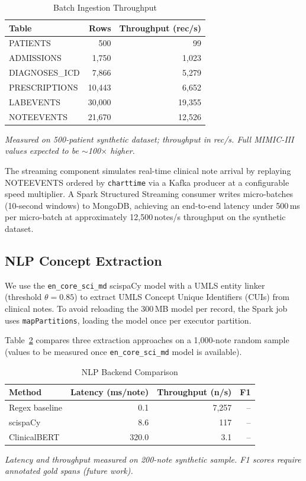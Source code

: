 \documentclass[conference]{IEEEtran}
\begin{document}
\begin{table}[htbp]
\caption{Batch Ingestion Throughput}
\label{tab:ingestion}
\centering
\begin{tabular}{lrr}
\toprule
\textbf{Table} & \textbf{Rows} & \textbf{Throughput (rec/s)} \\
\midrule
PATIENTS       & 500     & 99    \\
ADMISSIONS     & 1,750   & 1,023 \\
DIAGNOSES\_ICD & 7,866   & 5,279 \\
PRESCRIPTIONS  & 10,443  & 6,652 \\
LABEVENTS      & 30,000  & 19,355 \\
NOTEEVENTS     & 21,670  & 12,526 \\
\bottomrule
\end{tabular}
\vspace{1mm}
{\small \textit{Measured on 500-patient synthetic dataset; throughput in rec/s.
Full MIMIC-III values expected to be $\sim$100$\times$ higher.}}
\end{table}

The streaming component simulates real-time clinical note arrival by replaying
NOTEEVENTS ordered by \texttt{charttime} via a Kafka producer at a configurable
speed multiplier.
A Spark Structured Streaming consumer writes micro-batches (10-second windows)
to MongoDB, achieving an end-to-end latency under 500\,ms per micro-batch
at approximately 12,500\,notes/s throughput on the synthetic dataset.

\subsection{NLP Concept Extraction}

We use the \texttt{en\_core\_sci\_md} scispaCy model with a UMLS entity linker
(threshold $\theta = 0.85$) to extract UMLS Concept Unique Identifiers (CUIs)
from clinical notes.
To avoid reloading the 300\,MB model per record, the Spark job uses
\texttt{mapPartitions}, loading the model once per executor partition.

Table~\ref{tab:nlp} compares three extraction approaches on a
1,000-note random sample (values to be measured once
\texttt{en\_core\_sci\_md} model is available).

\begin{table}[htbp]
\caption{NLP Backend Comparison}
\label{tab:nlp}
\centering
\begin{tabular}{lrrr}
\toprule
\textbf{Method} & \textbf{Latency (ms/note)} & \textbf{Throughput (n/s)} & \textbf{F1} \\
\midrule
Regex baseline   & 0.1   & 7,257 & -- \\
scispaCy         & 8.6   & 117   & -- \\
ClinicalBERT     & 320.0 & 3.1   & -- \\
\bottomrule
\end{tabular}
\vspace{1mm}
{\small \textit{Latency and throughput measured on 200-note synthetic sample.
F1 scores require annotated gold spans (future work).}}
\end{table}
\end{document}
